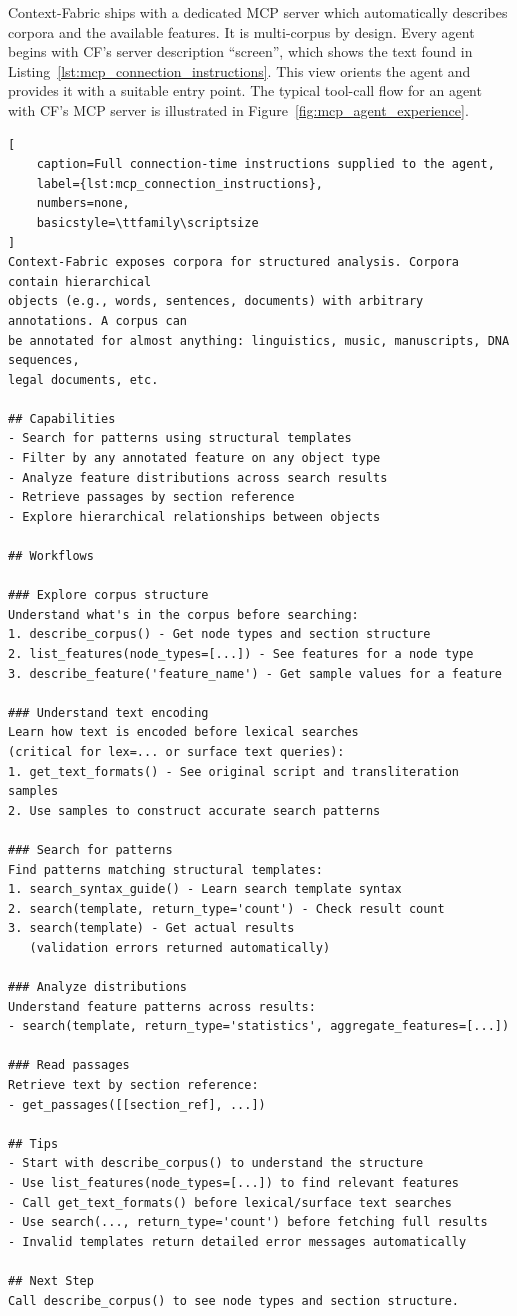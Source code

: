 \documentclass[11pt,a4paper]{article}
\begin{document}
Context-Fabric ships with a dedicated MCP server which automatically describes corpora and the
available features. It is multi-corpus by design. Every agent begins with CF's server description
``screen'', which shows the text found in Listing~\ref{lst:mcp_connection_instructions}. This view
orients the agent and provides it with a suitable entry point. The typical tool-call flow for an agent
with CF's MCP server is illustrated in Figure~\ref{fig:mcp_agent_experience}.

\begin{lstlisting}[
    caption=Full connection-time instructions supplied to the agent,
    label={lst:mcp_connection_instructions},
    numbers=none,
    basicstyle=\ttfamily\scriptsize
]
Context-Fabric exposes corpora for structured analysis. Corpora contain hierarchical
objects (e.g., words, sentences, documents) with arbitrary annotations. A corpus can
be annotated for almost anything: linguistics, music, manuscripts, DNA sequences,
legal documents, etc.

## Capabilities
- Search for patterns using structural templates
- Filter by any annotated feature on any object type
- Analyze feature distributions across search results
- Retrieve passages by section reference
- Explore hierarchical relationships between objects

## Workflows

### Explore corpus structure
Understand what's in the corpus before searching:
1. describe_corpus() - Get node types and section structure
2. list_features(node_types=[...]) - See features for a node type
3. describe_feature('feature_name') - Get sample values for a feature

### Understand text encoding
Learn how text is encoded before lexical searches
(critical for lex=... or surface text queries):
1. get_text_formats() - See original script and transliteration samples
2. Use samples to construct accurate search patterns

### Search for patterns
Find patterns matching structural templates:
1. search_syntax_guide() - Learn search template syntax
2. search(template, return_type='count') - Check result count
3. search(template) - Get actual results
   (validation errors returned automatically)

### Analyze distributions
Understand feature patterns across results:
- search(template, return_type='statistics', aggregate_features=[...])

### Read passages
Retrieve text by section reference:
- get_passages([[section_ref], ...])

## Tips
- Start with describe_corpus() to understand the structure
- Use list_features(node_types=[...]) to find relevant features
- Call get_text_formats() before lexical/surface text searches
- Use search(..., return_type='count') before fetching full results
- Invalid templates return detailed error messages automatically

## Next Step
Call describe_corpus() to see node types and section structure.
\end{lstlisting}
\end{document}
